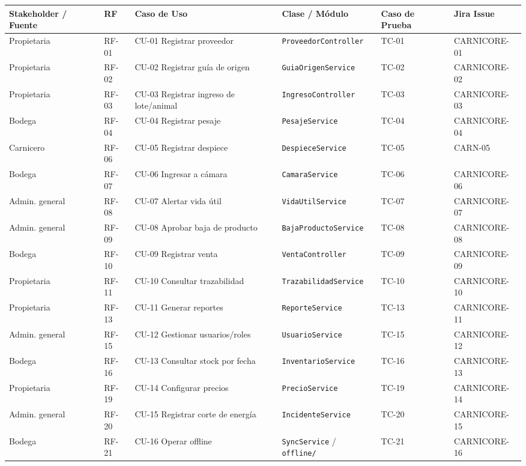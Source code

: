 \documentclass[11pt,a4paper]{article}
\begin{document}
\begin{longtable}{|p{2.1cm}|p{1.1cm}|p{2.6cm}|p{3.7cm}|p{1.3cm}|p{2.4cm}|}
\hline
\textbf{Stakeholder / Fuente} & \textbf{RF} & \textbf{Caso de Uso} & \textbf{Clase / Módulo} & \textbf{Caso de Prueba} & \textbf{Jira Issue} \\
\hline
\endhead
Propietaria & RF-01 & CU-01 Registrar proveedor & \texttt{ProveedorController} & TC-01 & CARNICORE-01 \\
\hline
Propietaria & RF-02 & CU-02 Registrar guía de origen & \texttt{GuiaOrigenService} & TC-02 & CARNICORE-02 \\
\hline
Propietaria & RF-03 & CU-03 Registrar ingreso de lote/animal & \texttt{IngresoController} & TC-03 & CARNICORE-03 \\
\hline
Bodega & RF-04 & CU-04 Registrar pesaje & \texttt{PesajeService} & TC-04 & CARNICORE-04 \\
\hline
Carnicero & RF-06 & CU-05 Registrar despiece & \texttt{DespieceService} & TC-05 & CARN-05 \\
\hline
Bodega & RF-07 & CU-06 Ingresar a cámara & \texttt{CamaraService} & TC-06 & CARNICORE-06 \\
\hline
Admin. general & RF-08 & CU-07 Alertar vida útil & \texttt{VidaUtilService} & TC-07 & CARNICORE-07 \\
\hline
Admin. general & RF-09 & CU-08 Aprobar baja de producto & \texttt{BajaProductoService} & TC-08 & CARNICORE-08 \\
\hline
Bodega & RF-10 & CU-09 Registrar venta & \texttt{VentaController} & TC-09 & CARNICORE-09 \\
\hline
Propietaria & RF-11 & CU-10 Consultar trazabilidad & \texttt{TrazabilidadService} & TC-10 & CARNICORE-10 \\
\hline
Propietaria & RF-13 & CU-11 Generar reportes & \texttt{ReporteService} & TC-13 & CARNICORE-11 \\
\hline
Admin. general & RF-15 & CU-12 Gestionar usuarios/roles & \texttt{UsuarioService} & TC-15 & CARNICORE-12 \\
\hline
Bodega & RF-16 & CU-13 Consultar stock por fecha & \texttt{InventarioService} & TC-16 & CARNICORE-13 \\
\hline
Propietaria & RF-19 & CU-14 Configurar precios & \texttt{PrecioService} & TC-19 & CARNICORE-14 \\
\hline
Admin. general & RF-20 & CU-15 Registrar corte de energía & \texttt{IncidenteService} & TC-20 & CARNICORE-15 \\
\hline
Bodega & RF-21 & CU-16 Operar offline & \texttt{SyncService} / \texttt{offline/} & TC-21 & CARNICORE-16 \\

\end{longtable}
\end{document}

